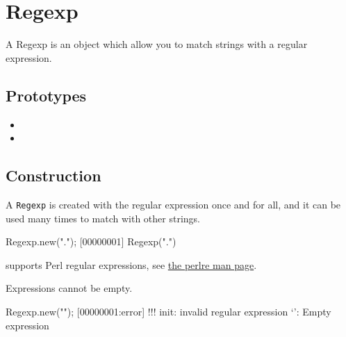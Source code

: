 
\section{Regexp}

A Regexp is an object which allow you to match strings with a regular
expression.

\subsection{Prototypes}
\begin{itemize}
\item {}
\item {}
\end{itemize}

\subsection{Construction}
\label{stdlib:regexp:ctor}

A \lstinline{Regexp} is created with the regular expression once and
for all, and it can be used many times to match with other strings.

\begin{urbiscript}
Regexp.new(".");
[00000001] Regexp(".")
\end{urbiscript}

\us supports Perl regular expressions, see
\href{http://perldoc.perl.org/perlre.html}{the perlre man page}.

Expressions cannot be empty.

\begin{urbiscript}
Regexp.new("");
[00000001:error] !!! init: invalid regular expression `': Empty expression
\end{urbiscript}



